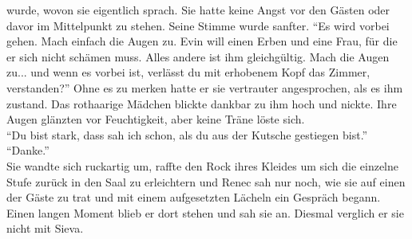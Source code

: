 wurde, wovon sie eigentlich sprach. Sie hatte keine Angst vor den Gästen oder davor im Mittelpunkt 
zu stehen. Seine Stimme wurde sanfter. ``Es wird vorbei gehen. Mach einfach die Augen zu. Evin will 
einen Erben und eine Frau, für die er sich nicht schämen muss. Alles andere ist ihm gleichgültig. 
Mach die Augen zu... und wenn es vorbei ist, verlässt du mit erhobenem Kopf das Zimmer, 
verstanden?'' Ohne es zu merken hatte er sie vertrauter angesprochen, als es ihm zustand. Das 
rothaarige Mädchen blickte dankbar zu ihm hoch und nickte. Ihre Augen glänzten vor Feuchtigkeit, 
aber keine Träne löste sich.\\
``Du bist stark, dass sah ich schon, als du aus der Kutsche gestiegen bist.''\\
``Danke.''\\
Sie wandte sich ruckartig um, raffte den Rock ihres Kleides um sich die einzelne Stufe zurück in 
den Saal zu erleichtern und Renec sah nur noch, wie sie auf einen der Gäste zu trat und mit einem 
aufgesetzten Lächeln ein Gespräch begann. Einen langen Moment blieb er dort stehen und sah sie an. 
Diesmal verglich er sie nicht mit Sieva. \\


